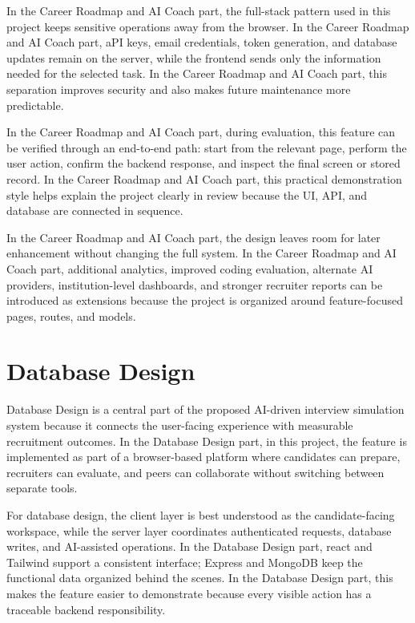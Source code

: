 \documentclass[12pt,a4paper]{report}
\begin{document}
In the Career Roadmap and AI Coach part, the full-stack pattern used in this project keeps sensitive operations away from the browser. In the Career Roadmap and AI Coach part, aPI keys, email credentials, token generation, and database updates remain on the server, while the frontend sends only the information needed for the selected task. In the Career Roadmap and AI Coach part, this separation improves security and also makes future maintenance more predictable.


In the Career Roadmap and AI Coach part, during evaluation, this feature can be verified through an end-to-end path: start from the relevant page, perform the user action, confirm the backend response, and inspect the final screen or stored record. In the Career Roadmap and AI Coach part, this practical demonstration style helps explain the project clearly in review because the UI, API, and database are connected in sequence.


In the Career Roadmap and AI Coach part, the design leaves room for later enhancement without changing the full system. In the Career Roadmap and AI Coach part, additional analytics, improved coding evaluation, alternate AI providers, institution-level dashboards, and stronger recruiter reports can be introduced as extensions because the project is organized around feature-focused pages, routes, and models.


\section{Database Design}

Database Design is a central part of the proposed AI-driven interview simulation system because it connects the user-facing experience with measurable recruitment outcomes. In the Database Design part, in this project, the feature is implemented as part of a browser-based platform where candidates can prepare, recruiters can evaluate, and peers can collaborate without switching between separate tools.


For database design, the client layer is best understood as the candidate-facing workspace, while the server layer coordinates authenticated requests, database writes, and AI-assisted operations. In the Database Design part, react and Tailwind support a consistent interface; Express and MongoDB keep the functional data organized behind the scenes. In the Database Design part, this makes the feature easier to demonstrate because every visible action has a traceable backend responsibility.
\end{document}
